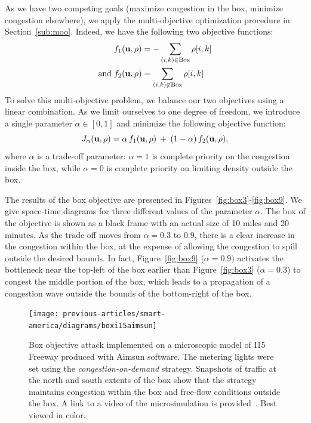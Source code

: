 As we have two competing goals (maximize congestion in the box, minimize congestion elsewhere), we apply the multi-objective optimization procedure in Section~\ref{sub:moo}. Indeed, we have the following two objective functions:
\begin{align}
	f_1 \left( \vectorize{u}, \vectorize{\rho} \right) & = - \sum_{(i,k) \in \text{Box}} \rho\left[i,k\right] \\ 
	\text{and} \; f_2 \left( \vectorize{u}, \vectorize{\rho} \right) & =  \sum_{(i,k) \not \in \text{Box}} \rho\left[i,k\right]
\end{align}
To solve this multi-objective problem, we balance our two objectives using a linear combination. As we limit ourselves to one degree of freedom, we introduce a single parameter $\alpha \in \left[0,1\right]$ and minimize the following objective function:
\begin{equation}
\label{eqn:alpha}
J_{\alpha} \left( \vectorize{u}, \vectorize{\rho} \right) = \alpha \, f_1 \left( \vectorize{u}, \vectorize{\rho} \right) \: + \: \left(1 - \alpha \right) \, f_2 \left( \vectorize{u}, \vectorize{\rho} \right),
\end{equation}
where $\alpha$ is a trade-off parameter: $\alpha = 1$ is complete priority on the congestion inside the box, while $\alpha = 0$ is complete priority on limiting density outside the box.


The results of the box objective are presented in Figures~\ref{fig:box3}-\ref{fig:box9}. We give space-time diagrams for three different values of the parameter $\alpha$. The box of the objective is shown as a black frame with an actual size of 10 miles and 20 minutes. As the trade-off moves from $\alpha=0.3$ to $0.9$, there is a clear increase in the congestion within the box, at the expense of allowing the congestion to spill outside the desired bounds. In fact, Figure~\ref{fig:box9} ($\alpha=0.9)$ activates the bottleneck near the top-left of the box earlier than Figure~\ref{fig:box3} ($\alpha=0.3$) to congest the middle portion of the box, which leads to a propagation of a congestion wave outside the bounds of the bottom-right of the box.

\begin{figure}
	\centering
	\texttt{[image: previous-articles/smart-america/diagrams/boxi15aimsun]}
	\caption{Box objective attack implemented on a microscopic model of I15 Freeway produced with Aimsun software.  The metering lights were set using the \emph{congestion-on-demand} strategy. Snapshots of traffic at the north and south extents of the box show that the strategy maintains congestion within the box and free-flow conditions outside the box. A link to a video of the microsimulation is provided~\cite{smartroadswebsite}. Best viewed in color.}
	\label{fig:boxi15aimsun}
\end{figure}

